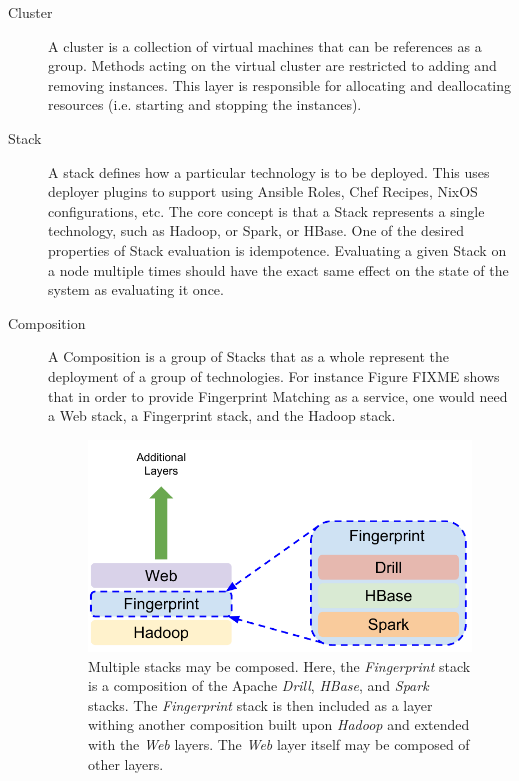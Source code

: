\documentclass[9pt,twocolumn,twoside]{styles/osajnl}
\begin{document}
\begin{description}

\item[Cluster] A cluster is a collection of virtual machines that can
  be references as a group. Methods acting on the virtual cluster are
  restricted to adding and removing instances. This layer is
  responsible for allocating and deallocating resources (i.e. starting
  and stopping the instances).


\item[Stack] A stack defines how a particular technology is to be
  deployed. This uses deployer plugins to support using Ansible Roles,
  Chef Recipes, NixOS configurations, etc. The core concept is that a
  Stack represents a single technology, such as Hadoop, or Spark, or
  HBase. One of the desired properties of Stack evaluation is
  idempotence. Evaluating a given Stack on a node multiple times
  should have the exact same effect on the state of the system as
  evaluating it once.


\item[Composition] A Composition is a group of Stacks that as a whole
  represent the deployment of a group of technologies. For instance
  Figure FIXME shows that in order to provide Fingerprint Matching as
  a service, one would need a Web stack, a Fingerprint stack, and the
  Hadoop stack.

  \begin{figure}
    \centering
    \includegraphics[width=1\columnwidth]{images/cloudmesh-stack-composition.pdf}
    \caption{Multiple stacks may be composed. Here, the
      {\it Fingerprint} stack is a composition of the Apache
      {\it Drill}, {\it HBase}, and {\it Spark}
      stacks. The {\it Fingerprint} stack is then included as a layer withing
      another composition built upon {\it Hadoop} and extended with the
      {\it Web} layers. The {\it Web} layer itself may be composed
      of other layers.
      \label{F:stack-composition}}
  \end{figure}


\end{description}
\end{document}
